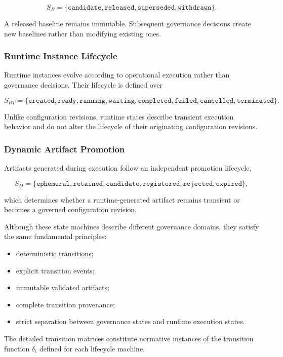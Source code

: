\documentclass[10pt]{article}
\begin{document}
\[
S_B=
\{
\texttt{candidate},
\texttt{released},
\texttt{superseded},
\texttt{withdrawn}
\}.
\]

A released baseline remains immutable. Subsequent governance decisions create new baselines rather than modifying existing ones.

\subsubsection{Runtime Instance Lifecycle}

Runtime instances evolve according to operational execution rather than governance decisions. Their lifecycle is defined over

\[
S_{RT}=
\{
\texttt{created},
\texttt{ready},
\texttt{running},
\texttt{waiting},
\texttt{completed},
\texttt{failed},
\texttt{cancelled},
\texttt{terminated}
\}.
\]

Unlike configuration revisions, runtime states describe transient execution behavior and do not alter the lifecycle of their originating configuration revisions.

\subsubsection{Dynamic Artifact Promotion}

Artifacts generated during execution follow an independent promotion lifecycle,

\[
S_D=
\{
\texttt{ephemeral},
\texttt{retained},
\texttt{candidate},
\texttt{registered},
\texttt{rejected},
\texttt{expired}
\},
\]

which determines whether a runtime-generated artifact remains transient or becomes a governed configuration revision.

Although these state machines describe different governance domains, they satisfy the same fundamental principles:

\begin{itemize}
    \item deterministic transitions;
    \item explicit transition events;
    \item immutable validated artifacts;
    \item complete transition provenance;
    \item strict separation between governance states and runtime execution states.
\end{itemize}

The detailed transition matrices constitute normative instances of the transition function \(\delta_i\) defined for each lifecycle machine.
\end{document}
